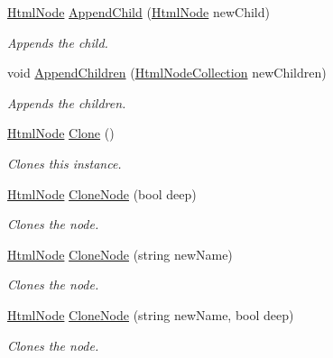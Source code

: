 \begin{DoxyCompactItemize}
\hyperlink{class_html_agility_pack_1_1_html_node}{Html\+Node} \hyperlink{class_html_agility_pack_1_1_html_node_af917eeb066983ef0519461c056efcef2}{Append\+Child} (\hyperlink{class_html_agility_pack_1_1_html_node}{Html\+Node} new\+Child)
\begin{DoxyCompactList}\small\item\em Appends the child. \end{DoxyCompactList}\item 
void \hyperlink{class_html_agility_pack_1_1_html_node_a4e519d2b6aa2103cf215c7f87c26afec}{Append\+Children} (\hyperlink{class_html_agility_pack_1_1_html_node_collection}{Html\+Node\+Collection} new\+Children)
\begin{DoxyCompactList}\small\item\em Appends the children. \end{DoxyCompactList}\item 
\hyperlink{class_html_agility_pack_1_1_html_node}{Html\+Node} \hyperlink{class_html_agility_pack_1_1_html_node_a206648e51299e69a1129f556968f7fdb}{Clone} ()
\begin{DoxyCompactList}\small\item\em Clones this instance. \end{DoxyCompactList}\item 
\hyperlink{class_html_agility_pack_1_1_html_node}{Html\+Node} \hyperlink{class_html_agility_pack_1_1_html_node_a9fc88469da53a2bef92ac1d829dd8068}{Clone\+Node} (bool deep)
\begin{DoxyCompactList}\small\item\em Clones the node. \end{DoxyCompactList}\item 
\hyperlink{class_html_agility_pack_1_1_html_node}{Html\+Node} \hyperlink{class_html_agility_pack_1_1_html_node_a0c0dac08627e56110b4121435378b307}{Clone\+Node} (string new\+Name)
\begin{DoxyCompactList}\small\item\em Clones the node. \end{DoxyCompactList}\item 
\hyperlink{class_html_agility_pack_1_1_html_node}{Html\+Node} \hyperlink{class_html_agility_pack_1_1_html_node_a677ad99a5b43a112bdca998a566227f8}{Clone\+Node} (string new\+Name, bool deep)
\begin{DoxyCompactList}\small\item\em Clones the node. \end{DoxyCompactList}\item 

\end{DoxyCompactItemize}
